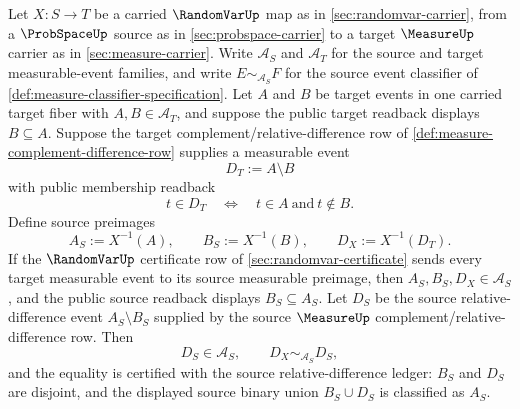 \begin{theorem}
\label{thm:randomvar-preimage-relative-difference-exactness}
Let $X:S\to T$ be a carried $\RandomVarUp$ map as in \autoref{sec:randomvar-carrier}, from a $\ProbSpaceUp$ source as in \autoref{sec:probspace-carrier} to a target $\MeasureUp$ carrier as in \autoref{sec:measure-carrier}. Write $\mathcal{A}_S$ and $\mathcal{A}_T$ for the source and target measurable-event families, and write $E\sim_{\mathcal{A}_S}F$ for the source event classifier of \autoref{def:measure-classifier-specification}. Let $A$ and $B$ be target events in one carried target fiber with $A,B\in\mathcal{A}_T$, and suppose the public target readback displays $B\subseteq A$. Suppose the target complement/relative-difference row of \autoref{def:measure-complement-difference-row} supplies a measurable event
$$
D_T:=A\setminus B
$$
with public membership readback
$$
t\in D_T\quad\Longleftrightarrow\quad t\in A\ \text{and}\ t\notin B.
$$
Define source preimages
$$
A_S:=X^{-1}(A),\qquad B_S:=X^{-1}(B),\qquad D_X:=X^{-1}(D_T).
$$
If the $\RandomVarUp$ certificate row of \autoref{sec:randomvar-certificate} sends every target measurable event to its source measurable preimage, then $A_S,B_S,D_X\in\mathcal{A}_S$, and the public source readback displays $B_S\subseteq A_S$. Let $D_S$ be the source relative-difference event $A_S\setminus B_S$ supplied by the source $\MeasureUp$ complement/relative-difference row. Then
$$
D_S\in\mathcal{A}_S,\qquad D_X\sim_{\mathcal{A}_S}D_S,
$$
and the equality is certified with the source relative-difference ledger: $B_S$ and $D_S$ are disjoint, and the displayed source binary union $B_S\cup D_S$ is classified as $A_S$.
\end{theorem}
